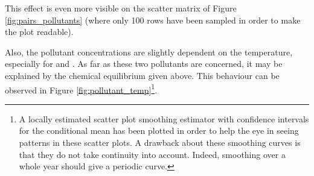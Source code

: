 \documentclass[a4paper, 12pt]{article}
\begin{document}
	This effect is even more visible on the scatter matrix of Figure \ref{fig:pairs_pollutants} (where only 100 rows have been sampled in order to make the plot readable). \par
	Also, the pollutant concentrations are slightly dependent on the temperature, especially for  and . As far as these two pollutants are concerned, it may be explained by the chemical equilibrium given above. This behaviour can be observed in Figure \ref{fig:pollutant_temp}\footnote{A locally estimated scatter plot smoothing estimator with confidence intervals for the conditional mean has been plotted in order to help the eye in seeing patterns in these scatter plots. A drawback about these smoothing curves is that they do not take continuity into account. Indeed, smoothing over a whole year should give a periodic curve.}. \par
\end{document}
